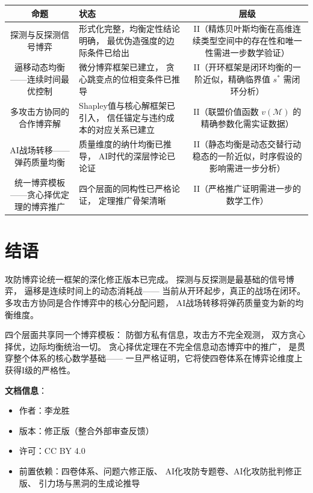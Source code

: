 \documentclass[11pt,a4paper]{article}
\begin{document}
\begin{center}
\begin{xltabular}{\textwidth}{c|X|c}
\toprule
\textbf{命题} & \textbf{状态} & \textbf{层级} \\
\midrule
探测与反探测信号博弈 &
形式化完整，均衡定性结论明确，
最优伪造强度的边际条件已给出 &
II（精炼贝叶斯均衡在高维连续类型空间中的存在性和唯一性需进一步数学验证） \\
逼移动态均衡——连续时间最优控制 &
微分博弈框架已建立，
贪心跳变点的位相变条件已推导 &
II（开环框架是闭环均衡的一阶近似，精确临界值 \(s^*\) 需闭环分析） \\
多攻击方协同的合作博弈解 &
Shapley值与核心解框架已引入，
信任锚定与违约成本的对应关系已建立 &
II（联盟价值函数 \(v(\mathcal{M})\) 的精确参数化需实证数据） \\
AI战场转移——弹药质量均衡 &
质量维度的纳什均衡已推导，
AI时代的深层悖论已论证 &
II（静态均衡是动态交替行动稳态的一阶近似，时序假设的影响需进一步分析） \\
统一博弈模板——贪心择优定理的博弈推广 &
四个层面的同构性已严格论证，
定理推广骨架清晰 &
II（严格推广证明需进一步的数学工作） \\
\bottomrule
\end{xltabular}
\end{center}

\section{结语}

攻防博弈论统一框架的深化修正版本已完成。
探测与反探测是最基础的信号博弈，
逼移是连续时间上的动态消耗战——
当前从开环起步，真正的战场在闭环。
多攻击方协同是合作博弈中的核心分配问题，
AI战场转移将弹药质量变为新的均衡维度。

四个层面共享同一个博弈模板：
防御方私有信息，攻击方不完全观测，
双方贪心择优，边际均衡统治一切。
贪心择优定理在不完全信息动态博弈中的推广，
是贯穿整个体系的核心数学基础——
一旦严格证明，它将使四卷体系在博弈论维度上获得I级的严格性。

\vspace{5mm}
\noindent\textbf{文档信息}：
\begin{itemize}
    \item 作者：李龙胜
    \item 版本：修正版（整合外部审查反馈）
    \item 许可：CC BY 4.0
    \item 前置依赖：四卷体系、问题六修正版、
          AI化攻防专题卷、AI化攻防批判修正版、
          引力场与黑洞的生成论推导
\end{itemize}
\end{document}

